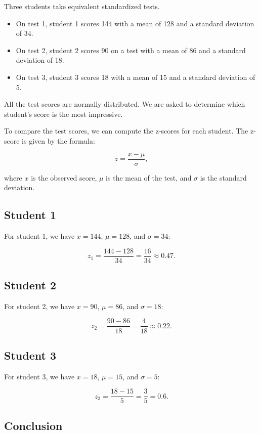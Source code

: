 \documentclass{article} %
\begin{document}
Three students take equivalent standardized tests. 

\begin{itemize}
    \item On test 1, student 1 scores 144 with a mean of 128 and a standard deviation of 34.
    \item On test 2, student 2 scores 90 on a test with a mean of 86 and a standard deviation of 18.
    \item On test 3, student 3 scores 18 with a mean of 15 and a standard deviation of 5.
\end{itemize}

All the test scores are normally distributed. We are asked to determine which student's score is the most impressive. 

To compare the test scores, we can compute the z-scores for each student. The z-score is given by the formula:

\[
z = \frac{x - \mu}{\sigma},
\]

where \( x \) is the observed score, \( \mu \) is the mean of the test, and \( \sigma \) is the standard deviation.

\subsection*{Student 1}

For student 1, we have \( x = 144 \), \( \mu = 128 \), and \( \sigma = 34 \):

\[
z_1 = \frac{144 - 128}{34} = \frac{16}{34} \approx 0.47.
\]

\subsection*{Student 2}

For student 2, we have \( x = 90 \), \( \mu = 86 \), and \( \sigma = 18 \):

\[
z_2 = \frac{90 - 86}{18} = \frac{4}{18} \approx 0.22.
\]

\subsection*{Student 3}

For student 3, we have \( x = 18 \), \( \mu = 15 \), and \( \sigma = 5 \):

\[
z_3 = \frac{18 - 15}{5} = \frac{3}{5} = 0.6.
\]

\subsection*{Conclusion}
\end{document}
